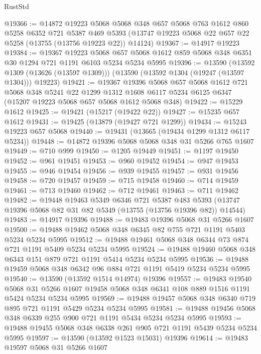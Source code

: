 \begin{lexlean}{RustStd}
\begin{coremodule}
@19366 := @14872
    @19223
    @5068
    @5068
    @348
    @657
    @5068
    @763
    @1612
    @860
    @5258
    @6352
    @721
    @5387
    @469
    @5393
    (@13747 @19223 @5068 @22 @657 @22 @5258 (@13755 (@13756 @19223 @22)) @14124)
@19367 := @14917 @19223
@19384 := @19367
    @19223
    @5068
    @657
    @5068
    @1612
    @859
    @5068
    @348
    @6351
    @30
    @1294
    @721
    @1191
    @6103
    @5234
    @5234
    @5995
@19396 := @13590
    (@13592 @1309 (@13626 (@13597 @1309)))
    (@13590 (@13592 @1304 (@19247 (@13597 @1304))) @19223)
@19421 := @19367
    @19396
    @5068
    @657
    @5068
    @1612
    @721
    @5068
    @348
    @5241
    @22
    @1299
    @1312
    @1608
    @6117
    @5234
    @6125
    @6347
    (@15207 @19223 @5068 @657 @5068 @1612 @5068 @348)
@19422 := @15229 @1612
@19425 := @19421 (@15217 (@19422 @22))
@19427 := @15235 @657 @1612
@19431 := @19425 (@13879 (@19427 @721 @1299))
@19434 := @15243 @19223 @657 @5068
@19440 := @19431 (@13665 (@19434 @1299 @1312 @6117 @5234))
@19448 := @14872 @19396 @5068 @5068 @348 @31 @5266 @765 @1607
@19449 := @710 @999
@19450 := @1205 @19449
@19451 := @1197 @19450
@19452 := @961 @19451
@19453 := @960 @19452
@19454 := @947 @19453
@19455 := @946 @19454
@19456 := @939 @19455
@19457 := @931 @19456
@19458 := @720 @19457
@19459 := @715 @19458
@19460 := @714 @19459
@19461 := @713 @19460
@19462 := @712 @19461
@19463 := @711 @19462
@19482 := @19448
    @19463
    @5349
    @6346
    @721
    @5387
    @483
    @5393
    (@13747 @19396 @5068 @82 @31 @82 @5349 (@13755 (@13756 @19396 @82)) @14544)
@19483 := @14917 @19396
@19488 := @19483 @19396 @5068 @31 @5266 @1607
@19500 := @19488 @19462 @5068 @348 @6345 @82 @755 @721 @1191 @5403 @5234 @5234 @5995
@19512 := @19488 @19461 @5068 @348 @6344 @73 @874 @721 @1191 @5409 @5234 @5234 @5995
@19524 := @19488 @19460 @5068 @348 @6343 @151 @879 @721 @1191 @5414 @5234 @5234 @5995
@19536 := @19488 @19459 @5068 @348 @6342 @96 @884 @721 @1191 @5419 @5234 @5234 @5995
@19540 := @13590 (@13592 @1514 @14974) @19396
@19557 := @19483
    @19540
    @5068
    @31
    @5266
    @1607
    @19458
    @5068
    @348
    @6341
    @108
    @889
    @1516
    @1191
    @5424
    @5234
    @5234
    @5995
@19569 := @19488 @19457 @5068 @348 @6340 @719 @895 @721 @1191 @5429 @5234 @5234 @5995
@19581 := @19488 @19456 @5068 @348 @6339 @255 @900 @721 @1191 @5434 @5234 @5234 @5995
@19593 := @19488 @19455 @5068 @348 @6338 @261 @905 @721 @1191 @5439 @5234 @5234 @5995
@19597 := @13590 (@13592 @1523 @15031) @19396
@19614 := @19483
    @19597
    @5068
    @31
    @5266
    @1607

\end{coremodule}
\end{lexlean}
